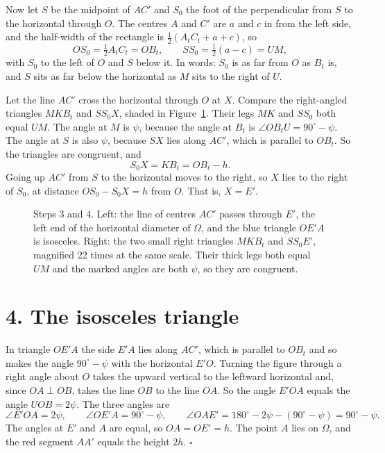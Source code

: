 \documentclass[11pt]{article}
\begin{document}
Now let $S$ be the midpoint of $AC'$ and $S_0$ the foot of the perpendicular from $S$ to the horizontal through $O$. The centres $A$ and $C'$ are $a$ and $c$ in from the left side, and the half-width of the rectangle is $\tfrac12(A_tC_t+a+c)$, so
\[
OS_0=\tfrac12A_tC_t=OB_t,\qquad SS_0=\tfrac12(a-c)=UM ,
\]
with $S_0$ to the left of $O$ and $S$ below it. In words: $S_0$ is as far from $O$ as $B_t$ is, and $S$ sits as far below the horizontal as $M$ sits to the right of $U$.

Let the line $AC'$ cross the horizontal through $O$ at $X$. Compare the right-angled triangles $MKB_t$ and $SS_0X$, shaded in Figure~\ref{fig:triangles}. Their legs $MK$ and $SS_0$ both equal $UM$. The angle at $M$ is $\psi$, because the angle at $B_t$ is $\angle OB_tU=90^\circ-\psi$. The angle at $S$ is also $\psi$, because $SX$ lies along $AC'$, which is parallel to $OB_t$. So the triangles are congruent, and
\[
S_0X=KB_t=OB_t-h .
\]
Going up $AC'$ from $S$ to the horizontal moves to the right, so $X$ lies to the right of $S_0$, at distance $OS_0-S_0X=h$ from $O$. That is, $X=E'$.

\begin{figure}[ht]
\centering

\caption{Steps 3 and 4. Left: the line of centres $AC'$ passes through $E'$, the left end of the horizontal diameter of $\Omega$, and the blue triangle $OE'A$ is isosceles. Right: the two small right triangles $MKB_t$ and $SS_0E'$, magnified 22 times at the same scale. Their thick legs both equal $UM$ and the marked angles are both $\psi$, so they are congruent.}
\label{fig:triangles}
\end{figure}

\section*{4. The isosceles triangle}

In triangle $OE'A$ the side $E'A$ lies along $AC'$, which is parallel to $OB_t$ and so makes the angle $90^\circ-\psi$ with the horizontal $E'O$. Turning the figure through a right angle about $O$ takes the upward vertical to the leftward horizontal and, since $OA\perp OB$, takes the line $OB$ to the line $OA$. So the angle $E'OA$ equals the angle $UOB=2\psi$. The three angles are
\[
\angle E'OA=2\psi,\qquad \angle OE'A=90^\circ-\psi,\qquad \angle OAE'=180^\circ-2\psi-(90^\circ-\psi)=90^\circ-\psi .
\]
The angles at $E'$ and $A$ are equal, so $OA=OE'=h$. The point $A$ lies on $\Omega$, and the red segment $AA'$ equals the height $2h$. \hfill$\square$
\end{document}
